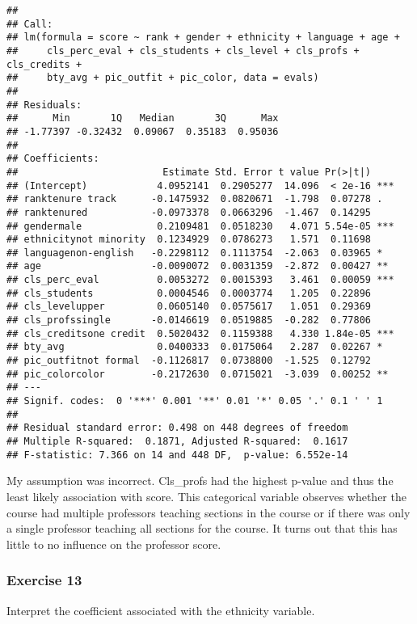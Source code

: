\documentclass[
]{article}
\begin{document}
\begin{verbatim}
## 
## Call:
## lm(formula = score ~ rank + gender + ethnicity + language + age + 
##     cls_perc_eval + cls_students + cls_level + cls_profs + cls_credits + 
##     bty_avg + pic_outfit + pic_color, data = evals)
## 
## Residuals:
##      Min       1Q   Median       3Q      Max 
## -1.77397 -0.32432  0.09067  0.35183  0.95036 
## 
## Coefficients:
##                         Estimate Std. Error t value Pr(>|t|)    
## (Intercept)            4.0952141  0.2905277  14.096  < 2e-16 ***
## ranktenure track      -0.1475932  0.0820671  -1.798  0.07278 .  
## ranktenured           -0.0973378  0.0663296  -1.467  0.14295    
## gendermale             0.2109481  0.0518230   4.071 5.54e-05 ***
## ethnicitynot minority  0.1234929  0.0786273   1.571  0.11698    
## languagenon-english   -0.2298112  0.1113754  -2.063  0.03965 *  
## age                   -0.0090072  0.0031359  -2.872  0.00427 ** 
## cls_perc_eval          0.0053272  0.0015393   3.461  0.00059 ***
## cls_students           0.0004546  0.0003774   1.205  0.22896    
## cls_levelupper         0.0605140  0.0575617   1.051  0.29369    
## cls_profssingle       -0.0146619  0.0519885  -0.282  0.77806    
## cls_creditsone credit  0.5020432  0.1159388   4.330 1.84e-05 ***
## bty_avg                0.0400333  0.0175064   2.287  0.02267 *  
## pic_outfitnot formal  -0.1126817  0.0738800  -1.525  0.12792    
## pic_colorcolor        -0.2172630  0.0715021  -3.039  0.00252 ** 
## ---
## Signif. codes:  0 '***' 0.001 '**' 0.01 '*' 0.05 '.' 0.1 ' ' 1
## 
## Residual standard error: 0.498 on 448 degrees of freedom
## Multiple R-squared:  0.1871, Adjusted R-squared:  0.1617 
## F-statistic: 7.366 on 14 and 448 DF,  p-value: 6.552e-14
\end{verbatim}

My assumption was incorrect. Cls\_profs had the highest p-value and thus
the least likely association with score. This categorical variable
observes whether the course had multiple professors teaching sections in
the course or if there was only a single professor teaching all sections
for the course. It turns out that this has little to no influence on the
professor score.

\hypertarget{exercise-13}{%
\subsubsection{Exercise 13}\label{exercise-13}}

Interpret the coefficient associated with the ethnicity variable.
\end{document}
